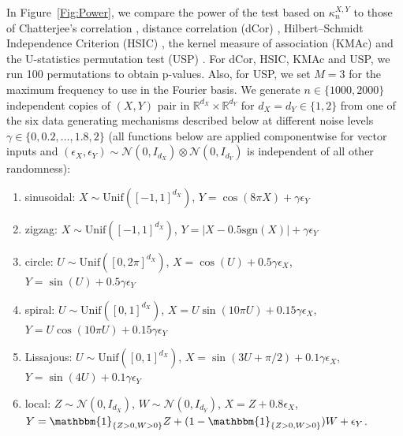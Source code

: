\documentclass[11pt]{article}
\begin{document}
In Figure~\ref{Fig:Power}, we compare the power of the test based on $\kappa_n^{X,Y}$ to those of Chatterjee's correlation \citep[][implemented in the \texttt{XICOR} R package]{chatterjee2021new}, distance correlation (dCor) \citep[][implemented in the \texttt{Rfast} R package]{szekely2007measuring}, Hilbert--Schmidt Independence Criterion  (HSIC) \citep[][implemented in the \texttt{dHSIC} R package]{gretton2008kernel}, the kernel measure of association (KMAc) \citep[][implemented in the \texttt{KPC} R package]{deb2020measuring} and the U-statistics permutation test (USP) \citep[][implemented in the \texttt{USP} R package]{berrett2021optimal}. For dCor, HSIC, KMAc and USP, we run 100 permutations to obtain p-values. Also, for USP, we set $M=3$ for the maximum frequency to use in the Fourier basis. We generate $n\in\{1000,2000\}$ independent copies of $(X,Y)$ pair in $\mathbb{R}^{d_X}\times \mathbb{R}^{d_Y}$ for $d_X=d_Y\in\{1,2\}$ from one of the six data generating mechanisms described below at different noise levels $\gamma\in\{0,0.2,\ldots,1.8,2\}$ (all functions below are applied componentwise for vector inputs and $(\epsilon_X, \epsilon_Y) \sim \mathcal{N}(0,I_{d_X})\otimes \mathcal{N}(0,I_{d_Y})$ is independent of all other randomness):
\begin{enumerate}[label=(\roman*)]
    \item sinusoidal: $X\sim \mathrm{Unif}([-1,1]^{d_X})$, $Y = \cos(8\pi X) + \gamma \epsilon_Y$
    \item zigzag: $X\sim \mathrm{Unif}([-1,1]^{d_X})$, $Y = |X - 0.5\mathrm{sgn}(X)| + \gamma \epsilon_Y$
    \item circle: $U \sim \mathrm{Unif}([0,2\pi]^{d_X})$, $X = \cos(U) + 0.5\gamma \epsilon_X$, $Y = \sin(U) + 0.5\gamma\epsilon_Y$
    \item spiral: $U \sim \mathrm{Unif}([0,1]^{d_X})$, $X = U \sin(10\pi U) + 0.15\gamma\epsilon_X$, $Y = U \cos(10\pi U) + 0.15\gamma\epsilon_Y$
    \item Lissajous: $U \sim \mathrm{Unif}([0,1]^{d_X})$, $X = \sin(3U + \pi / 2) + 0.1\gamma\epsilon_X$, $Y = \sin(4U) + 0.1\gamma\epsilon_Y$
    \item local: $Z \sim \mathcal{N}(0, I_{d_X})$, $W \sim \mathcal{N}(0, I_{d_Y})$, $X = Z+ 0.8\epsilon_X$, $Y = \mathbbm{1}_{\{Z>0, W>0\}} Z + (1- \mathbbm{1}_{\{Z>0, W>0\}}) W + \epsilon_Y$.
\end{enumerate}
\end{document}
